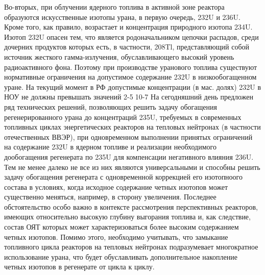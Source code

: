 Во-вторых, при облучении ядерного топлива в активной зоне реактора образуются искусственные изотопы урана, в первую очередь, 232U и 236U. Кроме того, как правило, возрастает и концентрация природного изотопа 234U. Изотоп 232U опасен тем, что является родоначальником цепочки распадов, среди дочерних продуктов которых есть,  в частности, 208Tl, представляющий собой источник жесткого гамма-излучения, обуславливающего высокий уровень радиоактивного фона. Поэтому при производстве уранового топлива существуют нормативные ограничения на допустимое содержание 232U в низкообогащенном уране. На текущий момент в РФ допустимые концентрации (в мас. долях) 232U в НОУ не должны превышать значений 2-510-7%
На сегодняшний день предложен ряд технических решений, позволяющих решить задачу обогащения регенерированного урана до концентраций 235U, требуемых в современных топливных циклах энергетических реакторов на тепловых нейтронах (в частности отечественных ВВЭР), при одновременном выполнении принятых ограничений на содержание 232U в ядерном топливе и реализации необходимого дообогащения регенерата по 235U для компенсации негативного влияния 236U. Тем не менее далеко не все из них являются универсальными и способны решить задачу обогащения регенерата с одновременной коррекцией его изотопноого состава в условиях, когда исходное содержание четных изотопов может существенно меняться, например, в сторону увеличения. Последнее обстоятельство особо важно в контексте рассмотрения перспективных реакторов, имеющих относительно высокую глубину выгорания топлива и, как следствие, состав ОЯТ которых может характеризоваться более высоким содержанием четных изотопов. Помимо этого, необходимо учитывать, что замыкание топливного цикла реакторов на тепловых нейтронах подразумевает многократное использование урана, что будет обуславливать дополнительное накопление четных изотопов в регенерате от цикла к циклу.   
